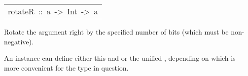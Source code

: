 \begin{haddockdesc}
\begin{haddockdesc}
\end{haddockdesc}
\begin{haddockdesc}
\item[\begin{tabular}{@{}l}
rotateR\ ::\ a\ ->\ Int\ ->\ a
\end{tabular}]\haddockbegindoc
Rotate the argument right by the specified number of bits
        (which must be non-negative).
\par
An instance can define either this and  or the unified
        , depending on which is more convenient for the type in
        question. 
\par

\end{haddockdesc}
\end{haddockdesc}
\begin{haddockdesc}
\item[\begin{tabular}{@{}l}
instance\ Bits\ Int\\instance\ Bits\ Int8\\instance\ Bits\ Int16\\instance\ Bits\ Int32\\instance\ Bits\ Int64\\instance\ Bits\ Integer\\instance\ Bits\ Word\\instance\ Bits\ Word8\\instance\ Bits\ Word16\\instance\ Bits\ Word32\\instance\ Bits\ Word64\\instance\ Bits\ CChar\\instance\ Bits\ CSChar\\instance\ Bits\ CUChar\\instance\ Bits\ CShort\\instance\ Bits\ CUShort\\instance\ Bits\ CInt\\instance\ Bits\ CUInt\\instance\ Bits\ CLong\\instance\ Bits\ CULong\\instance\ Bits\ CLLong\\instance\ Bits\ CULLong\\instance\ Bits\ CPtrdiff\\instance\ Bits\ CSize\\instance\ Bits\ CWchar\\instance\ Bits\ CSigAtomic\\instance\ Bits\ CIntPtr\\instance\ Bits\ CUIntPtr\\instance\ Bits\ CIntMax\\instance\ Bits\ CUIntMax
\end{tabular}]
\end{haddockdesc}